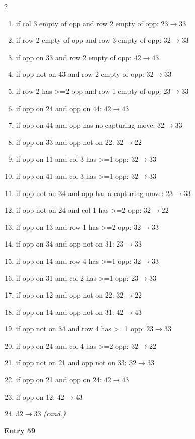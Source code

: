 \begin{multicols}{2}
\begin{tikzpicture}[scale=0.24]
\end{tikzpicture}
\nopagebreak\begin{enumerate}[topsep=1pt,itemsep=0pt,parsep=0pt,leftmargin=2.2em,label=\arabic*.]
\item if col 3 empty of opp and row 2 empty of opp: $23\!\to\!33$
\item if row 2 empty of opp and row 3 empty of opp: $32\!\to\!33$
\item if opp on 33 and row 2 empty of opp: $42\!\to\!43$
\item if opp not on 43 and row 2 empty of opp: $32\!\to\!33$
\item if row 2 has >=2 opp and row 1 empty of opp: $23\!\to\!33$
\item if opp on 24 and opp on 44: $42\!\to\!43$
\item if opp on 44 and opp has no capturing move: $32\!\to\!33$
\item if opp on 33 and opp not on 22: $32\!\to\!22$
\item if opp on 11 and col 3 has >=1 opp: $32\!\to\!33$
\item if opp on 41 and col 3 has >=1 opp: $32\!\to\!33$
\item if opp not on 34 and opp has a capturing move: $23\!\to\!33$
\item if opp not on 24 and col 1 has >=2 opp: $32\!\to\!22$
\item if opp on 13 and row 1 has >=2 opp: $32\!\to\!33$
\item if opp on 34 and opp not on 31: $23\!\to\!33$
\item if opp on 14 and row 4 has >=1 opp: $32\!\to\!33$
\item if opp on 31 and col 2 has >=1 opp: $23\!\to\!33$
\item if opp on 12 and opp not on 22: $32\!\to\!22$
\item if opp on 14 and opp not on 31: $42\!\to\!43$
\item if opp not on 34 and row 4 has >=1 opp: $23\!\to\!33$
\item if opp on 24 and col 4 has >=2 opp: $32\!\to\!22$
\item if opp not on 21 and opp not on 33: $32\!\to\!33$
\item if opp on 21 and opp on 24: $42\!\to\!43$
\item if opp on 12: $42\!\to\!43$
\item $32\!\to\!33$ \hfill\textit{(cand.)}
\end{enumerate}\smallskip
\noindent\textbf{Entry 59} \; 
\end{multicols}
